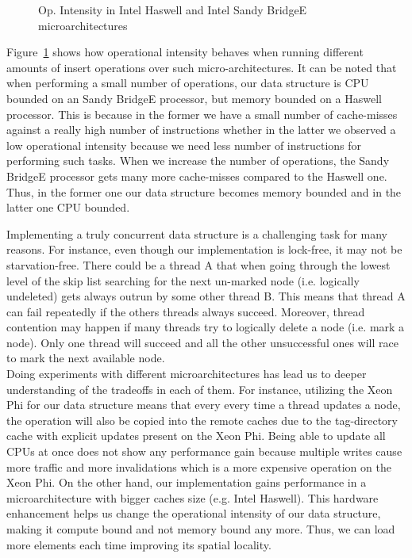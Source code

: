 \begin{figure}[t]
	\centering
	
	\caption{Op. Intensity in Intel Haswell and Intel Sandy BridgeE microarchitectures}
	\label{fig:haswell_ivybridge}
\end{figure}

Figure~\ref{fig:haswell_ivybridge} shows how operational intensity behaves when running different amounts of insert operations over such micro-architectures. It can be noted that when performing a small number of operations, our data structure is CPU bounded on an Sandy BridgeE processor, but memory bounded on a Haswell processor. This is because in the former we have a small number of cache-misses against a really high number of instructions whether in the latter we observed a low operational intensity because we need less number of instructions for performing such tasks. When we increase the number of operations, the Sandy BridgeE processor gets many more cache-misses compared to the Haswell one. Thus, in the former one our data structure becomes memory bounded and in the latter one CPU bounded.


Implementing a truly concurrent data structure is a challenging task for many reasons. For instance, even though our implementation is lock-free, it may not be starvation-free. There could be a thread A that when going through the lowest level of the skip list searching for the next un-marked node (i.e. logically undeleted) gets always outrun by some other thread B. This means that thread A can fail repeatedly if the others threads always succeed. Moreover, thread contention may happen if many threads try to logically delete a node (i.e. mark a node). Only one thread will succeed and all the other unsuccessful ones will race to mark
the next available node.\\
Doing experiments with different microarchitectures has lead us to deeper understanding of the tradeoffs in each of them. For instance, utilizing the Xeon Phi for our data structure means that every every time a thread updates a node, the operation will also be copied into the remote caches due to the tag-directory cache with explicit updates present on the Xeon Phi. Being able to update all CPUs at once does not show any performance gain because multiple writes cause more traffic and more invalidations which is a more expensive operation on the Xeon Phi. On the other hand, our implementation gains performance in a microarchitecture with bigger caches size (e.g. Intel Haswell). This hardware enhancement helps us change the operational intensity of our data structure, making it compute bound and not memory bound any more. Thus, we can load more elements each time improving its spatial locality.

